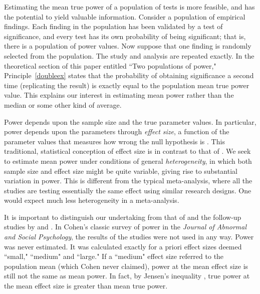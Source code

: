 \documentclass[jou]{apa6} %
\begin{document}
Estimating the mean true power of a population of tests is more feasible, and has the potential to yield valuable information. Consider a population of empirical findings. Each finding in the population has been validated by a test of significance, and every test has its own probability of being significant; that is, there is a population of power values. Now suppose that one finding is randomly selected from the population. The study and analysis are repeated exactly. In the theoretical section of this paper entitled ``Two populations of power,"  Principle~\ref{doubleex} states that the probability of obtaining significance a second time (replicating the result) is exactly equal to the population mean true power value. This explains our interest in estimating mean power rather than the median or some other kind of average.

Power depends upon the sample size and the true parameter values. In particular, power depends upon the parameters through \emph{effect size}, a function of the parameter values that measures how wrong the null hypothesis is \parencite{Cohen1962, Cohen1988, GrissomKim2012}. This traditional, statistical conception of effect size is in contrast to that of \textcite{KellyPreacher2012}. 
We seek to estimate mean power under conditions of general \emph{heterogeneity}, in which both sample size and effect size might be quite variable, giving rise to substantial variation in power. This is different from the typical meta-analysis, where all the studies are testing essentially the same effect using similar research designs. One would expect much less heterogeneity in a meta-analysis.

It is important to distinguish our undertaking from that of \textcite{Cohen1962} and the follow-up studies by
\textcite{ChaseChase1976} and \textcite{SedlGig1989}. In Cohen's classic survey of power in the \emph{Journal of Abnormal and Social Psychology}, the results of the studies were not used in any way. Power was never estimated. It was calculated exactly for a priori effect sizes deemed  ``small," ``medium" and ``large." If a ``medium" effect size referred to the population mean (which Cohen never claimed), power at the mean effect size is still not the same as mean power. In fact, by Jensen's inequality \parencite[][p.~283]{Billingsley1986},
true power at the mean effect size is greater than mean true power.
\end{document}
